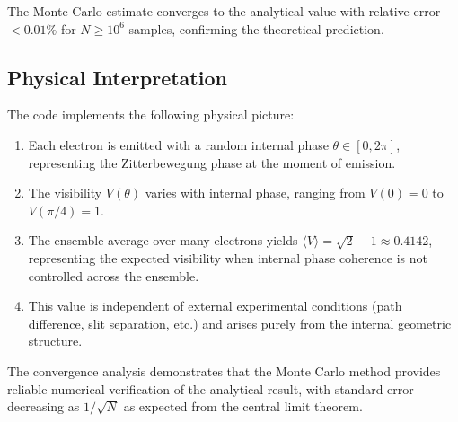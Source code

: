 \documentclass[%
 reprint,
 amsmath,amssymb,
 aps,
 prb,
]{revtex4-2}
\numberwithin{equation}{section}
\begin{document}
The Monte Carlo estimate converges to the analytical value with relative error $< 0.01\%$ for $N \geq 10^6$ samples, confirming the theoretical prediction.


\subsection{Physical Interpretation}

The code implements the following physical picture:
\begin{enumerate}
\item Each electron is emitted with a random internal phase $\theta \in [0, 2\pi]$, representing the Zitterbewegung phase at the moment of emission.
\item The visibility $V(\theta)$ varies with internal phase, ranging from $V(0) = 0$ to $V(\pi/4) = 1$.
\item The ensemble average over many electrons yields $\langle V \rangle = \sqrt{2}-1 \approx 0.4142$, representing the expected visibility when internal phase coherence is not controlled across the ensemble.
\item This value is independent of external experimental conditions (path difference, slit separation, etc.) and arises purely from the internal geometric structure.
\end{enumerate}

The convergence analysis demonstrates that the Monte Carlo method provides reliable numerical verification of the analytical result, with standard error decreasing as $1/\sqrt{N}$ as expected from the central limit theorem.

\clearpage
\end{document}
